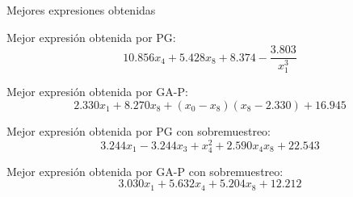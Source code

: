 \documentclass{beamer}
\begin{document}
\begin{frame}{Mejores expresiones obtenidas}

	Mejor expresión obtenida por PG:
	\begin{equation} \label{eq:PG_completo}
	10.856 x_{4} + 5.428 x_{8} + 8.374 - \frac{3.803}{x_{1}^{3}}
	\end{equation}

	Mejor expresión obtenida por GA-P:
	\begin{equation} \label{eq:GAP_completo}
	2.330 x_{1} + 8.270 x_{8} + \left(x_{0} - x_{8}\right) \left(x_{8} - 2.330\right) + 16.945
	\end{equation}

	Mejor expresión obtenida por PG con sobremuestreo:
	\begin{equation} \label{eq:PG_completo_over}
	3.244 x_{1} - 3.244 x_{3} + x_{4}^{2} + 2.590 x_{4} x_{8} + 22.543
	\end{equation}

	Mejor expresión obtenida por GA-P con sobremuestreo:
	\begin{equation} \label{eq:GAP_completo_over}
	3.030 x_{1} + 5.632 x_{4} + 5.204 x_{8} + 12.212
	\end{equation}

\end{frame}
\end{document}
